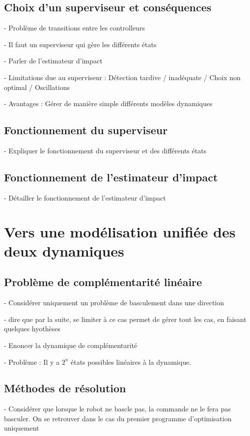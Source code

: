 		\subsection{Choix d'un superviseur et conséquences}

			- Problème de transitions entre les controlleurs

			- Il faut un superviseur qui gère les différents états

			- Parler de l'estimateur d'impact

			- Limitations due au superviseur : Détection tardive / inadéquate / Choix non optimal / Oscillations

			- Avantages : Gérer de manière simple différents modèles dynamiques

		\subsection{Fonctionnement du superviseur}

			- Expliquer le fonctionnement du superviseur et des différents états

		\subsection{Fonctionnement de l'estimateur d'impact}

			- Détailler le fonctionnement de l'estimateur d'impact

	\section{Vers une modélisation unifiée des deux dynamiques}
		\subsection{Problème de complémentarité linéaire}

			- Considérer uniquement un problème de basculement dans une direction

			- dire que par la suite, se limiter à ce cas permet de gérer tout les cas, en faisant quelques hyothèses

			- Enoncer la dynamique de complémentarité

			- Problème : Il y a $2^n$ états possibles linéaires à la dynamique.

		\subsection{Méthodes de résolution}
				- Considérer que lorsque le robot ne bascle pas, la commande ne le fera pas basculer. On se retrouver dans le cas du premier programme d'optimisation uniquement

